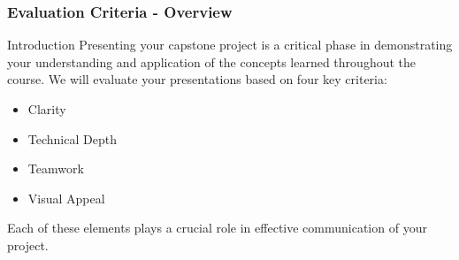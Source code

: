 \documentclass{beamer}
\begin{document}
\begin{frame}[fragile]
    \frametitle{Evaluation Criteria - Overview}
    \begin{block}{Introduction}
        Presenting your capstone project is a critical phase in demonstrating your understanding and application of the concepts learned throughout the course. 
        We will evaluate your presentations based on four key criteria:
        \begin{itemize}
            \item Clarity
            \item Technical Depth
            \item Teamwork
            \item Visual Appeal
        \end{itemize}
        Each of these elements plays a crucial role in effective communication of your project.
    \end{block}
\end{frame}
\end{document}
